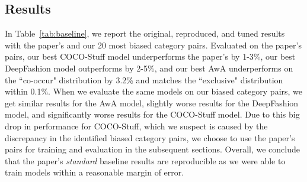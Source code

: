 \subsection{Results} \label{sec:baselineresults}

In Table~\ref{tab:baseline}, we report the original, reproduced, and tuned results with the paper's and our 20 most biased category pairs. Evaluated on the paper's pairs, our best COCO-Stuff model underperforms the paper's by 1-3\%, our best DeepFashion model outperforms by 2-5\%, and our best AwA underperforms on the ``co-occur" distribution by 3.2\% and matches the ``exclusive" distribution within 0.1\%. When we evaluate the same models on our biased category pairs, we get similar results for the AwA model, slightly worse results for the DeepFashion model, and significantly worse results for the COCO-Stuff model. Due to this big drop in performance for COCO-Stuff, which we suspect is caused by the discrepancy in the identified biased category pairs, we choose to use the paper's pairs for training and evaluation in the subsequent sections. Overall, we conclude that the paper's \emph{standard} baseline results are reproducible as we were able to train models within a reasonable margin of error.

